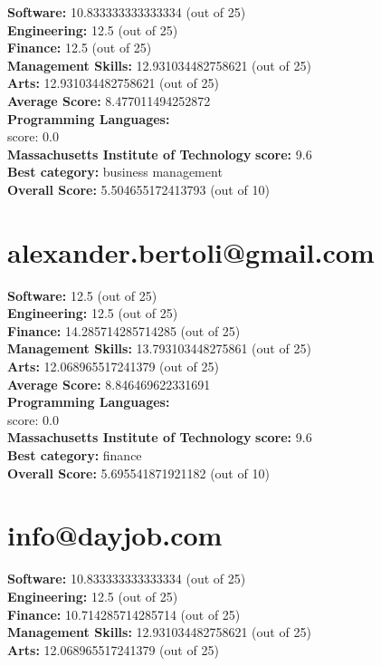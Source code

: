 \documentclass{article}
\begin{document}
\textbf{Software:} 10.833333333333334 (out of 25)\\
\textbf{Engineering: } 12.5 (out of 25)\\
\textbf{Finance:} 12.5 (out of 25)\\
\textbf{Management Skills:} 12.931034482758621 (out of 25)\\
\textbf{Arts:} 12.931034482758621 (out of 25)\\
\textbf{Average Score: } 8.477011494252872\\
\textbf{Programming Languages:} \\
score: 0.0\\
\textbf{Massachusetts Institute of Technology} \textbf{score:} 9.6\\
\textbf{Best category: } business management\\
\textbf{Overall Score: }5.504655172413793 (out of 10)\section{alexander.bertoli@gmail.com}
\textbf{Software:} 12.5 (out of 25)\\
\textbf{Engineering: } 12.5 (out of 25)\\
\textbf{Finance:} 14.285714285714285 (out of 25)\\
\textbf{Management Skills:} 13.793103448275861 (out of 25)\\
\textbf{Arts:} 12.068965517241379 (out of 25)\\
\textbf{Average Score: } 8.846469622331691\\
\textbf{Programming Languages:} \\
score: 0.0\\
\textbf{Massachusetts Institute of Technology} \textbf{score:} 9.6\\
\textbf{Best category: } finance\\
\textbf{Overall Score: }5.695541871921182 (out of 10)\section{info@dayjob.com}
\textbf{Software:} 10.833333333333334 (out of 25)\\
\textbf{Engineering: } 12.5 (out of 25)\\
\textbf{Finance:} 10.714285714285714 (out of 25)\\
\textbf{Management Skills:} 12.931034482758621 (out of 25)\\
\textbf{Arts:} 12.068965517241379 (out of 25)\\
\end{document}
